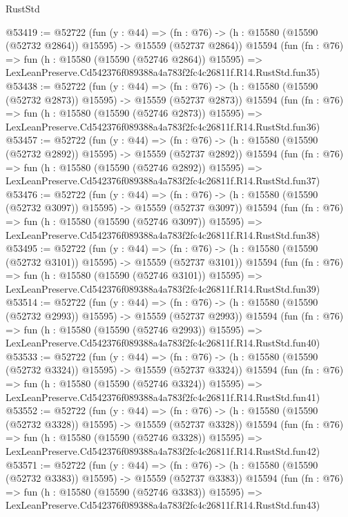 \begin{lexlean}{RustStd}
\begin{coremodule}
@53419 := @52722
    (fun (y : @44) =>
    (fn : @76) -> (h : @15580 (@15590 (@52732 @2864)) @15595) -> @15559 (@52737 @2864))
    @15594
    (fun (fn : @76) =>
    fun (h : @15580 (@15590 (@52746 @2864)) @15595) =>
    LexLeanPreserve.Cd542376f089388a4a783f2fc4c26811f.R14.RustStd.fun35)
@53438 := @52722
    (fun (y : @44) =>
    (fn : @76) -> (h : @15580 (@15590 (@52732 @2873)) @15595) -> @15559 (@52737 @2873))
    @15594
    (fun (fn : @76) =>
    fun (h : @15580 (@15590 (@52746 @2873)) @15595) =>
    LexLeanPreserve.Cd542376f089388a4a783f2fc4c26811f.R14.RustStd.fun36)
@53457 := @52722
    (fun (y : @44) =>
    (fn : @76) -> (h : @15580 (@15590 (@52732 @2892)) @15595) -> @15559 (@52737 @2892))
    @15594
    (fun (fn : @76) =>
    fun (h : @15580 (@15590 (@52746 @2892)) @15595) =>
    LexLeanPreserve.Cd542376f089388a4a783f2fc4c26811f.R14.RustStd.fun37)
@53476 := @52722
    (fun (y : @44) =>
    (fn : @76) -> (h : @15580 (@15590 (@52732 @3097)) @15595) -> @15559 (@52737 @3097))
    @15594
    (fun (fn : @76) =>
    fun (h : @15580 (@15590 (@52746 @3097)) @15595) =>
    LexLeanPreserve.Cd542376f089388a4a783f2fc4c26811f.R14.RustStd.fun38)
@53495 := @52722
    (fun (y : @44) =>
    (fn : @76) -> (h : @15580 (@15590 (@52732 @3101)) @15595) -> @15559 (@52737 @3101))
    @15594
    (fun (fn : @76) =>
    fun (h : @15580 (@15590 (@52746 @3101)) @15595) =>
    LexLeanPreserve.Cd542376f089388a4a783f2fc4c26811f.R14.RustStd.fun39)
@53514 := @52722
    (fun (y : @44) =>
    (fn : @76) -> (h : @15580 (@15590 (@52732 @2993)) @15595) -> @15559 (@52737 @2993))
    @15594
    (fun (fn : @76) =>
    fun (h : @15580 (@15590 (@52746 @2993)) @15595) =>
    LexLeanPreserve.Cd542376f089388a4a783f2fc4c26811f.R14.RustStd.fun40)
@53533 := @52722
    (fun (y : @44) =>
    (fn : @76) -> (h : @15580 (@15590 (@52732 @3324)) @15595) -> @15559 (@52737 @3324))
    @15594
    (fun (fn : @76) =>
    fun (h : @15580 (@15590 (@52746 @3324)) @15595) =>
    LexLeanPreserve.Cd542376f089388a4a783f2fc4c26811f.R14.RustStd.fun41)
@53552 := @52722
    (fun (y : @44) =>
    (fn : @76) -> (h : @15580 (@15590 (@52732 @3328)) @15595) -> @15559 (@52737 @3328))
    @15594
    (fun (fn : @76) =>
    fun (h : @15580 (@15590 (@52746 @3328)) @15595) =>
    LexLeanPreserve.Cd542376f089388a4a783f2fc4c26811f.R14.RustStd.fun42)
@53571 := @52722
    (fun (y : @44) =>
    (fn : @76) -> (h : @15580 (@15590 (@52732 @3383)) @15595) -> @15559 (@52737 @3383))
    @15594
    (fun (fn : @76) =>
    fun (h : @15580 (@15590 (@52746 @3383)) @15595) =>
    LexLeanPreserve.Cd542376f089388a4a783f2fc4c26811f.R14.RustStd.fun43)

\end{coremodule}
\end{lexlean}
